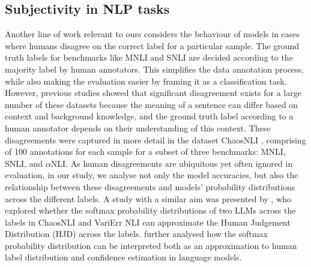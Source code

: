 \subsection{Subjectivity in NLP tasks}
\label{related:subjectivity}
Another line of work relevant to ours considers the behaviour of models in cases where humans disagree on the correct label for a particular sample. 
The ground truth labels for benchmarks like MNLI and SNLI are decided according to the majority label by human annotators. 
This simplifies the data annotation process, while also making the evaluation easier by framing it as a classification task. 
However, previous studies \citep{pavlick-kwiatkowski-2019-inherent, nie-etal-2020-learn} showed that significant disagreement exists for a large number of these datasets because the meaning of a sentence can differ based on context and background knowledge, and the ground truth label according to a human annotator depends on their understanding of this context. 
These disagreements were captured in more detail in the dataset ChaosNLI \citep{nie-etal-2020-learn}, comprising of 100 annotations for each sample for a subset of three benchmarks: MNLI, SNLI, and $\alpha$NLI.
As human disagreements are ubiquitous yet often ignored in evaluation, in our study, we analyse not only the model accuracies, but also the relationship between these disagreements and models' probability distributions across the different labels.
A study with a similar aim was presented by \citet{chen2024seeingbig}, who explored whether the softmax probability distributions of two LLMs across the labels in ChaosNLI and VariErr NLI \citep{weber-genzel-etal-2024-varierr} can approximate the Human Judgement Distribution (HJD) across the labels. 
\citet{baan-etal-2024-interpreting} further analysed how the softmax probability distribution can be interpreted both as an approximation to human label distribution and confidence estimation in language models.
